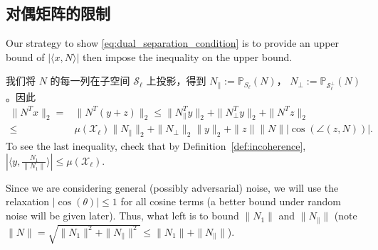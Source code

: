 \documentclass[main.tex]{subfiles}
\begin{document}
\subsection{对偶矩阵的限制}\label{sec:dual_separation}

Our strategy to show \eqref{eq:dual_separation_condition} is to provide an upper bound of $|\langle x, N \rangle|$ then impose the inequality on the upper bound.

我们将 $N$ 的每一列在子空间 $\mathcal{S}_{\ell}$ 上投影，得到 $N_{\parallel} :=\mathbb{P}_{S_\ell}(N)$，
$N_{\perp} := \mathbb{P}_{\mathcal{S}_{\ell}^\perp}(N)$。因此
\begin{align}\label{eq:showing_dual_sep_cond}
  \| N^T x \|_2 =& \| N^T (y+z)\|_2 \leq \| N_{\parallel}^T y\|_2+\|
  N_{\perp}^T y\|_2+\|N^T z\|_2\\
  \leq& \mu(\mathcal{X}_{\ell}) \|N_{\parallel}\|_2 + \|N_{\perp}\|_2\|y\|_2
  + \|z\|\|N\||\cos(\angle (z,N))|.
\end{align}
To see the last inequality, check that by Definition~\ref{def:incoherence}, $|\langle y,\frac{N_1}{\|N_1\|}\rangle| \leq\mu(\mathcal{X}_{\ell})$.

Since we are considering general (possibly adversarial) noise, we will use the relaxation $|\cos(\theta)|\leq 1$ for all cosine terms (a better bound under random noise will be given later). Thus, what left is to bound $\|N_1\|$ and $\|N_{\parallel}\|$ (note $\|N\|=\sqrt{\|N_1\|^2+\|N_{\parallel}\|^2} \leq \|N_1\|+\|N_{\parallel}\|$).
\end{document}
